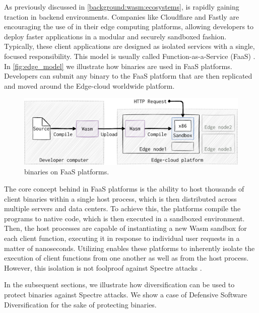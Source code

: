 


As previously discussed in \autoref{background:wasm:ecosystems}, \Wasm is rapidly gaining traction in backend environments. 
Companies like Cloudflare and Fastly are encouraging the use of \Wasm in their edge computing platforms, allowing developers to deploy faster applications in a modular and securely sandboxed fashion. 
Typically, these client \Wasm applications are designed as isolated services with a single, focused responsibility.
This model is usually called Function-as-a-Service (FaaS) \cite{pMendkiServerless, 1244493Jacobsson}.
In \autoref{fig:edge_model} we illustrate how \Wasm binaries are used in FaaS platforms.
Developers can submit any \Wasm binary to the FaaS platform that are then replicated and moved around the Edge-cloud worldwide platform.


\begin{figure}[h]
    \centering
    \includegraphics[width=0.8\linewidth]{figures/edge.pdf}
    \caption{\Wasm binaries on FaaS platforms.}
    \label{fig:edge_model}
\end{figure}

The core concept behind \wasm in FaaS platforms is the ability to host thousands of client \Wasm binaries within a single host process, which is then distributed across multiple servers and data centers. 
To achieve this, the platforms compile the \wasm programs to native code, which is then executed in a sandboxed environment.
Then, the host processes are capable of instantiating a new Wasm sandbox for each client function, executing it in response to individual user requests in a matter of nanoseconds. 
Utilizing \Wasm enables these platforms to inherently isolate the execution of client functions from one another as well as from the host process.
However, this isolation is not foolproof against Spectre attacks \cite{Spectre,Narayan2021Swivel}.


In the subsequent sections, we illustrate how diversification can be used to protect \Wasm binaries against Spectre attacks.
We show a case of Defensive Software Diversification for the sake of protecting \Wasm binaries. 


